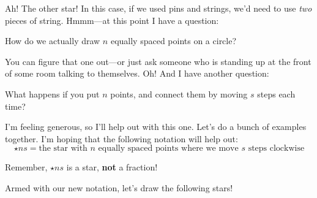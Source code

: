Ah! The other star! In this case, if we used pins and strings, we'd
need to use \textit{two} pieces of string. Hmmm---at this point I have
a question:
\begin{ques} 
How do we actually draw $n$ equally spaced points on a circle?
\end{ques}
\QM 
You can figure that one out---or just ask someone who is standing up at
the front of some room talking to themselves. Oh! And I have another
question:
\begin{ques} 
What happens if you put $n$ points, and connect them by moving $s$
steps each time?
\end{ques}
I'm feeling generous, so I'll help out with this one. Let's do a bunch
of examples together. I'm hoping that the following notation will help
out:
\[
\star{n}{s}=\text{the star with $n$ equally spaced points where we move $s$ steps clockwise}
\]
\begin{war}
Remember, $\star{n}{s}$ is a star, \textbf{not} a fraction!
\end{war}
Armed with our new notation, let's draw the following stars!

